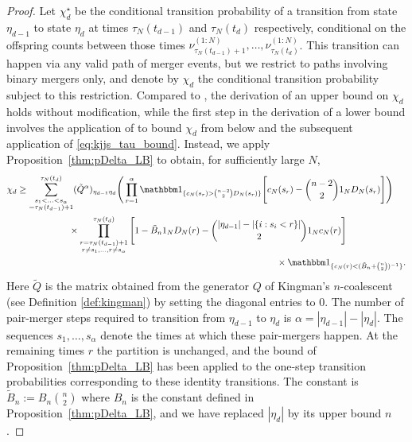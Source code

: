 \begin{proof}
Let $\chi^\star_d$ be the conditional transition probability of a transition from state $\eta_{d-1}$ to state $\eta_d$ at times $\tau_N(t_{d-1})$ and $\tau_N(t_d)$ respectively, conditional on the offspring counts between those times $\nu^{(1:N)}_{\tau_N(t_{d-1}) +1} , \dots, \nu^{(1:N)}_{\tau_N(t_d)}$. 
This transition can happen via any valid path of merger events, but we restrict to paths involving binary mergers only, and denote by $\chi_d$ the conditional transition probability subject to this restriction.
Compared to \textcite[Proof of Theorem 1]{koskela2018}, the derivation of an upper bound on $\chi_d$ holds without modification, while the first step in the derivation of a lower bound \parencite[p.14]{koskela2018} involves the application of \textcite[Lemma 1 Case 1]{koskela2018} to bound $\chi_d$ from below and the subsequent application of \eqref{eq:kjjs_tau_bound}.
Instead, we apply Proposition~\ref{thm:pDelta_LB} to obtain, for sufficiently large $N$,
\begin{align*}
\chi_d 
&\geq \sum_{\substack{ s_1 < \ldots < s_{ \alpha } 
        \\= \tau_N( t_{ d - 1 } ) + 1 }}^{ \tau_N( t_d ) } 
        ( \tilde{ Q }^{ \alpha } )_{ \eta_{ d - 1 } \eta_d } 
        \Bigg( \prod_{ r = 1 }^{ \alpha } \I{ c_N(s_r) > \binom{n-2}{2} D_N(s_r) }
        \Bigg[ c_N( s_r ) - \binom{ n - 2 }{ 2 } \ON D_N( s_r ) \Bigg] \Bigg) \\
    &\hspace{2cm} \times \prod_{ \substack{ r = \tau_N( t_{ d - 1 } ) + 1 
        \\ r \neq s_1, \ldots, r \neq s_{ \alpha } } }^{ \tau_N( t_d ) } 
        \Bigg[ 1 - \tilde{B}_n \ON D_N( r ) 
        - \binom{ | \eta_{ d - 1 } | - | \{ i : s_i < r \} | }{ 2 } \ON c_N( r ) \Bigg] \\
    &\hspace{10cm}\times \I{ c_N(r) < (\tilde{B}_n + \binom{n}{2})^{-1} } .
\end{align*}
Here $\tilde{Q}$ is the matrix obtained from the generator $Q$ of Kingman's $n$-coalescent (see Definition \ref{def:kingman}) by setting the diagonal entries to 0.
The number of pair-merger steps required to transition from $\eta_{d-1}$ to $\eta_d$ is $\alpha = |\eta_{d-1}| - |\eta_d|$. The sequences $s_1,\dots,s_\alpha$ denote the times at which these pair-mergers happen. 
At the remaining times $r$ the partition is unchanged, and the bound of Proposition~\ref{thm:pDelta_LB} has been applied to the one-step transition probabilities corresponding to these identity transitions. 
The constant is $\tilde{B}_n := B_n\binom{n}{2}$ where $B_n$ is the constant defined in Proposition~\ref{thm:pDelta_LB}, and we have replaced $|\eta_d|$ by its upper bound $n$.


\end{proof}
